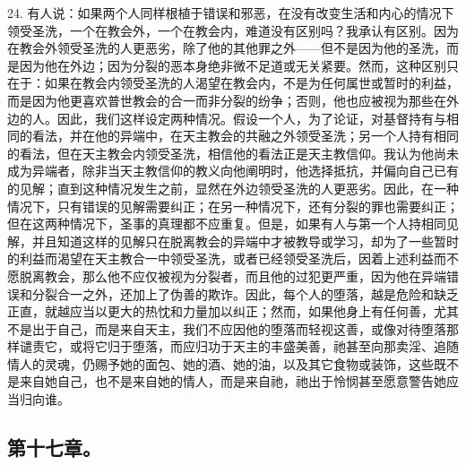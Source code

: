 24. 有人说：如果两个人同样根植于错误和邪恶，在没有改变生活和内心的情况下领受圣洗，一个在教会外，一个在教会内，难道没有区别吗？我承认有区别。因为在教会外领受圣洗的人更恶劣，除了他的其他罪之外——但不是因为他的圣洗，而是因为他在外边；因为分裂的恶本身绝非微不足道或无关紧要。然而，这种区别只在于：如果在教会内领受圣洗的人渴望在教会内，不是为任何属世或暂时的利益，而是因为他更喜欢普世教会的合一而非分裂的纷争；否则，他也应被视为那些在外边的人。因此，我们这样设定两种情况。假设一个人，为了论证，对基督持有与相同的看法，并在他的异端中，在天主教会的共融之外领受圣洗；另一个人持有相同的看法，但在天主教会内领受圣洗，相信他的看法正是天主教信仰。我认为他尚未成为异端者，除非当天主教信仰的教义向他阐明时，他选择抵抗，并偏向自己已有的见解；直到这种情况发生之前，显然在外边领受圣洗的人更恶劣。因此，在一种情况下，只有错误的见解需要纠正；在另一种情况下，还有分裂的罪也需要纠正；但在这两种情况下，圣事的真理都不应重复。但是，如果有人与第一个人持相同见解，并且知道这样的见解只在脱离教会的异端中才被教导或学习，却为了一些暂时的利益而渴望在天主教合一中领受圣洗，或者已经领受圣洗后，因着上述利益而不愿脱离教会，那么他不应仅被视为分裂者，而且他的过犯更严重，因为他在异端错误和分裂合一之外，还加上了伪善的欺诈。因此，每个人的堕落，越是危险和缺乏正直，就越应当以更大的热忱和力量加以纠正；然而，如果他身上有任何善，尤其不是出于自己，而是来自天主，我们不应因他的堕落而轻视这善，或像对待堕落那样谴责它，或将它归于堕落，而应归功于天主的丰盛美善，祂甚至向那卖淫、追随情人的灵魂，仍赐予她的面包、她的酒、她的油，以及其它食物或装饰，这些既不是来自她自己，也不是来自她的情人，而是来自祂，祂出于怜悯甚至愿意警告她应当归向谁。\par


\subsection{第十七章。}

